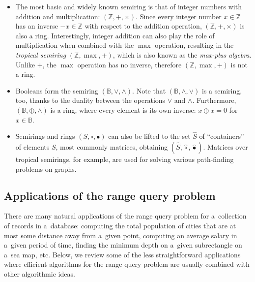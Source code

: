 \documentclass{toc}
\begin{document}
\begin{itemize}
    \item The most basic and widely known semiring is that of integer numbers with
    addition and multiplication: $(\mathbb{Z}, +, \times)$. Since every integer
    number $x\in \mathbb{Z}$ has an inverse $-x \in \mathbb{Z}$ with respect to
    the addition operation, $(\mathbb{Z}, +, \times)$ is also a ring.
    Interestingly, integer addition can also play the role of multiplication when
    combined with the $\max$ operation, resulting in the \emph{tropical semiring}
    $(\mathbb{Z}, \max, +)$, which is also known as the \emph{max-plus algebra}.
    Unlike $+$, the $\max$ operation has no inverse, therefore
    $(\mathbb{Z}, \max, +)$ is not a ring.

    \item Booleans form the semiring $(\mathbb{B}, \vee, \wedge)$. Note that
$(\mathbb{B}, \wedge, \vee)$ is a semiring, too, %
    thanks to the duality between
    the operations $\vee$ and $\wedge$. Furthermore,
    $(\mathbb{B}, \oplus, \wedge)$ is a ring, where every element is its own
    inverse: $x \oplus x = 0$ for $x \in \mathbb{B}$.

    \item Semirings and rings $(S, \circ, \bullet)$ can also be lifted to the set
    $\hat{S}$ of ``containers'' of elements $S$, most commonly matrices, obtaining
    $(\hat{S}, \hat{\circ}, \hat{\bullet})$. Matrices over tropical semirings, for
    example, are used for solving various path-finding problems on graphs.
\end{itemize}

\subsection{Applications of the range query problem}\label{subseq:rmqapp}
There are many natural applications of the 
range query
problem for a~collection of records in a~database: computing the total population of cities that are at most some distance away from a~given point, computing an average salary in a~given period of time, finding the minimum depth on a~given subrectangle on a~sea map, etc. Below, we review some of the less straightforward applications where efficient algorithms for the 
range query
problem are usually combined with other algorithmic ideas.
\end{document}
